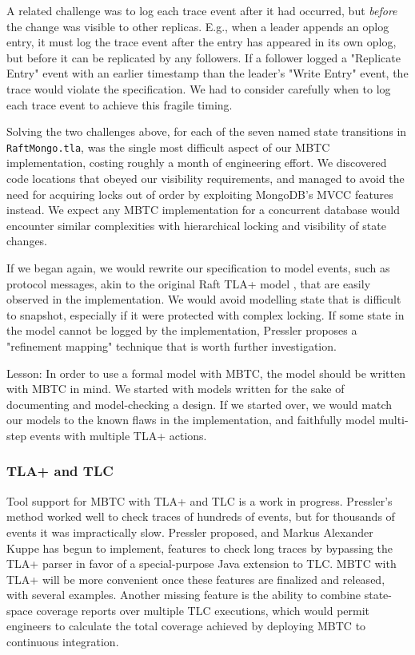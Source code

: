 \documentclass{vldb}
\begin{document}
A related challenge was to log each trace event after it had occurred, but \textit{before} the change was visible to other replicas. 
E.g., when a leader appends an oplog entry, it must log the trace event after the entry has appeared in its own oplog, but before it can be replicated by any followers. 
If a follower logged a "Replicate Entry" event with an earlier timestamp than the leader's "Write Entry" event, the trace would violate the specification. 
We had to consider carefully when to log each trace event to achieve this fragile timing.

Solving the two challenges above, for each of the seven named state transitions in \texttt{RaftMongo.tla}, was the single most difficult aspect of our MBTC implementation, costing roughly a month of engineering effort. 
We discovered code locations that obeyed our visibility requirements, and managed to avoid the need for acquiring locks out of order by exploiting MongoDB's MVCC features instead.
We expect any MBTC implementation for a concurrent database would encounter similar complexities with hierarchical locking and visibility of state changes.


If we began again, we would rewrite our specification to model events, such as protocol messages, akin to the original Raft TLA+ model \cite{Ongaro14TLA+Raft}, that are easily observed in the implementation. 
We would avoid modelling state that is difficult to snapshot, especially if it were protected with complex locking. 
If some state in the model cannot be logged by the implementation, Pressler proposes a "refinement mapping" technique \cite{Pressler18VerifyingSoftwareTracesTLAPlus} that is worth further investigation.

Lesson: In order to use a formal model with MBTC, the model should be written with MBTC in mind. 
We started with models written for the sake of documenting and model-checking a design. 
If we started over, we would match our models to the known flaws in the implementation, and faithfully model multi-step events with multiple TLA+ actions.

\subsubsection{TLA+ and TLC}
\label{subsubsec:mbtc_tla_tlc}

Tool support for MBTC with TLA+ and TLC is a work in progress. 
Pressler's method worked well to check traces of hundreds of events, but for thousands of events it was impractically slow. 
Pressler proposed, and Markus Alexander Kuppe has begun to implement, features to check long traces by bypassing the TLA+ parser in favor of a special-purpose Java extension to TLC. 
MBTC with TLA+ will be more convenient once these features are finalized and released, with several examples. 
Another missing feature is the ability to combine state-space coverage reports over multiple TLC executions, which would permit engineers to calculate the total coverage achieved by deploying MBTC to continuous integration.
\end{document}
